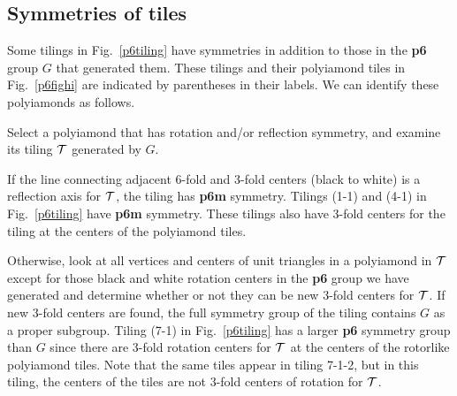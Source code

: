 \documentclass{ws-ijcga}
\begin{document}
\subsection{Symmetries of tiles}
Some tilings in Fig.~\ref{p6tiling} have symmetries in addition to those in the {\bf p6} group $G$ 
that generated them. 
These tilings and their polyiamond tiles in Fig.~\ref{p6fighi} are indicated by parentheses 
in their labels. We can identify these polyiamonds as follows.
\begin{itemlist}
\item
Select a polyiamond that has rotation and/or reflection symmetry, and examine its tiling $\cal T$
generated by $G$.
\item
If the line connecting adjacent 6-fold and 3-fold centers (black to white) is a reflection axis
for $\cal T$, the tiling has {\bf p6m} symmetry. 
Tilings (1-1) and (4-1) in Fig.~\ref{p6tiling} have {\bf p6m} symmetry.
These tilings also have 3-fold centers for the tiling at the centers of the polyiamond tiles.
\item
Otherwise, look at all vertices and centers of unit triangles in a polyiamond in $\cal T$ except for
those black and white rotation centers in the {\bf p6} group we have generated and determine whether
or not they can be new 3-fold centers for $\cal T$. 
If new 3-fold centers are found, the full symmetry 
group of the tiling contains $G$ as a proper subgroup. 
Tiling (7-1) in Fig.~\ref{p6tiling} has a larger {\bf p6} symmetry group than $G$ 
since there are 3-fold rotation centers for $\cal T$ at the centers of the rotorlike polyiamond tiles. 
Note that the same tiles appear in tiling 7-1-2, but in this tiling, the centers
of the tiles are not 3-fold centers of rotation for $\cal T$.
\end{itemlist}
\end{document}

